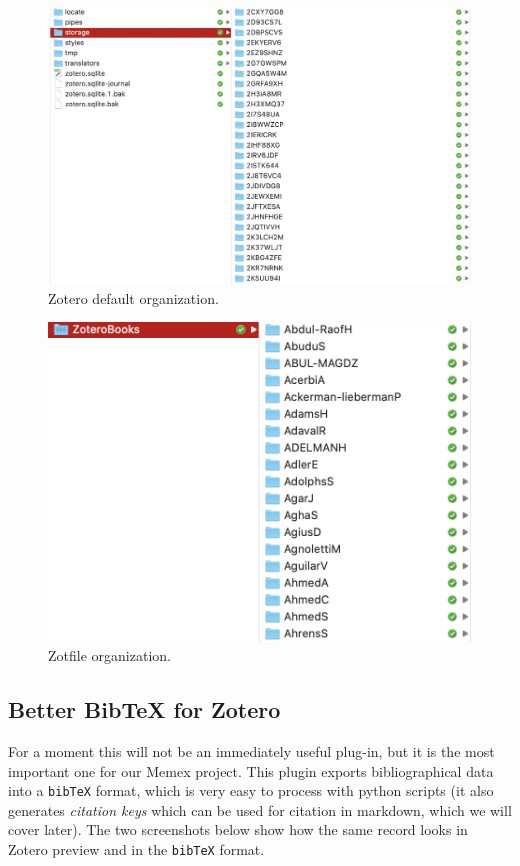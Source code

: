 \documentclass[
]{book}
\begin{document}
\begin{figure}
\centering
\includegraphics{./images/zotero_default.png}
\caption{Zotero default organization.}
\end{figure}

\begin{figure}
\centering
\includegraphics{./images/zotero_zotfile.png}
\caption{Zotfile organization.}
\end{figure}

\hypertarget{better-bibtex-for-zotero}{%
\subsection{Better BibTeX for Zotero}\label{better-bibtex-for-zotero}}

For a moment this will not be an immediately useful plug-in, but it is the most important one for our Memex project. This plugin exports bibliographical data into a \texttt{bibTeX} format, which is very easy to process with python scripts (it also generates \emph{citation keys} which can be used for citation in markdown, which we will cover later). The two screenshots below show how the same record looks in Zotero preview and in the \texttt{bibTeX} format.
\end{document}
